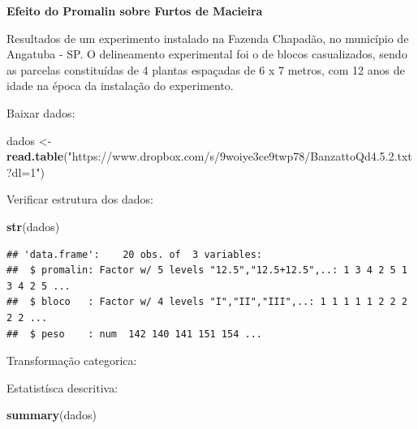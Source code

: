 \documentclass[
]{book}
\newenvironment{Shaded}{\begin{snugshade}}{\end{snugshade}}
\newcommand{\KeywordTok}[1]{\textcolor[rgb]{0.13,0.29,0.53}{\textbf{#1}}}
\newcommand{\NormalTok}[1]{#1}
\newcommand{\OperatorTok}[1]{\textcolor[rgb]{0.81,0.36,0.00}{\textbf{#1}}}
\newcommand{\StringTok}[1]{\textcolor[rgb]{0.31,0.60,0.02}{#1}}
\begin{document}
\textbf{Efeito do Promalin sobre Furtos de Macieira}

Resultados de um experimento instalado na Fazenda Chapadão, no município de Angatuba - SP. O delineamento experimental foi o de blocos casualizados, sendo as parcelas constituídas de 4 plantas espaçadas de 6 x 7 metros, com 12 anos de idade na época da instalação do experimento.

Baixar dados:

\begin{Shaded}
\begin{Highlighting}[]
\NormalTok{dados <-}\StringTok{ }\KeywordTok{read.table}\NormalTok{(}\StringTok{"https://www.dropbox.com/s/9woiye3ce9twp78/BanzattoQd4.5.2.txt?dl=1"}\NormalTok{)}
\end{Highlighting}
\end{Shaded}

Verificar estrutura dos dados:

\begin{Shaded}
\begin{Highlighting}[]
\KeywordTok{str}\NormalTok{(dados)}
\end{Highlighting}
\end{Shaded}

\begin{verbatim}
## 'data.frame':    20 obs. of  3 variables:
##  $ promalin: Factor w/ 5 levels "12.5","12.5+12.5",..: 1 3 4 2 5 1 3 4 2 5 ...
##  $ bloco   : Factor w/ 4 levels "I","II","III",..: 1 1 1 1 1 2 2 2 2 2 ...
##  $ peso    : num  142 140 141 151 154 ...
\end{verbatim}

Transformação categorica:

\begin{Shaded}
\end{Shaded}

Estatistísca descritiva:

\begin{Shaded}
\begin{Highlighting}[]
\KeywordTok{summary}\NormalTok{(dados)}
\end{Highlighting}
\end{Shaded}
\end{document}
